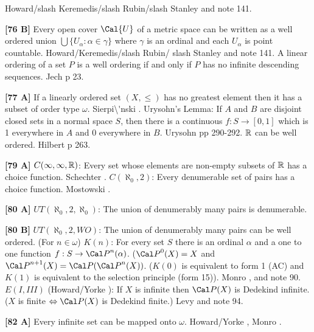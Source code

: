 \ac{Howard/slash Keremedis/slash Rubin/slash Stanley} \cite{1999} and
note 141.
\smallskip
\item{}{\bf [76 B]} Every open cover $\Cal{U}$ of a metric space  can be
written as a well ordered union $\bigcup\{U_\alpha:\alpha\in\gamma\}$
where $\gamma$ is an ordinal and each $U_\alpha$ is point countable.
\ac{Howard/Keremedis/slash Rubin/ slash Stanley} \cite{1999} and note 141.
\medskip
{} A linear ordering of a set $P$ is a well ordering
if and only if $P$ has no infinite descending sequences. \ac{Jech}
\cite{1973b} p 23.
\smallskip
\item{}{\bf [77 A]}  If a linearly ordered set $(X,\le)$ has  no
greatest element then it has a subset of order type $\omega$.
\ac{Sierpi\'nski} \cite{1918}.
\medskip
{} Urysohn's Lemma:  If $A$ and $B$ are disjoint closed
sets in a normal space $S$, then there is a continuous $f:S\rightarrow
[0,1]$ which is 1 everywhere in $A$ and 0 everywhere in $B$.
\ac{Urysohn} \cite{1925} pp 290-292.  
\medskip
{} ${\Bbb R}$ can be well ordered.  \ac{Hilbert}
\cite{1900} p 263.
\smallskip
\item{}{\bf [79 A]}  $C(\infty,\infty,{\Bbb R})$:  Every set  whose
elements  are non-empty subsets of ${\Bbb R}$ has a choice function.
\ac{Schechter} \cite{1996a}.
\medskip
{} $C(\aleph_{0},2)$:  Every denumerable set of  pairs
has  a  choice function.  \ac{Mostowski} \cite{1948}.
\smallskip
\item{}{\bf [80 A]} $UT(\aleph_0,2,\aleph_0)$: The union of denumerably
many pairs is denumerable.
\smallskip
\item{}{\bf [80 B]} $UT(\aleph_0,2, WO)$: The union of denumerably
many pairs can be well ordered.
\medskip
{} (For $n\in\omega$) $K(n)$: For every
set $S$ there is an ordinal $\alpha$ and a one to one function
$f: S \rightarrow {\Cal P}^{n}(\alpha)$. (${\Cal P}^{0}(X) = X$
and ${\Cal P}^{n+1}(X) = {\Cal P}({\Cal P}^{n}(X))$. ($K(0)$ is
equivalent to form 1 (AC)  and $K(1)$ is equivalent to the selection
principle (form 15)). \ac{Monro} \cite{1972}, \cite{1973b} and note 90.
\medskip
{} $E(I,III)$ (\ac{Howard/Yorke} \cite{1989}): If $X$
is infinite then $\Cal P(X)$ is Dedekind infinite. ($X$ is finite
$\Leftrightarrow {\Cal P}(X)$ is Dedekind finite.) \ac{Levy} \cite{1958}
and note 94.
\smallskip
\item{}{\bf [82 A]} Every infinite set can be mapped onto $\omega$.
\ac{Howard/Yorke} \cite{1989}, \ac{Monro} \cite{1972}.
